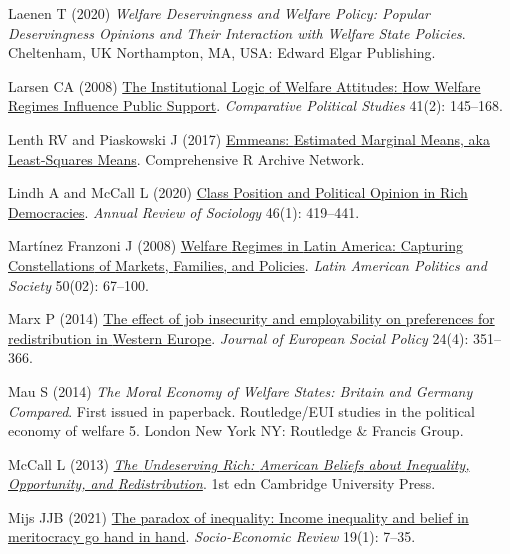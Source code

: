 \documentclass[
  12pt,
]{article}
\newlength{\cslhangindent}
\newenvironment{CSLReferences}[2] %
 {\begin{list}{}{%
  \setlength{\itemindent}{0pt}
  \setlength{\leftmargin}{0pt}
  \setlength{\parsep}{0pt}
  \ifodd #1
   \setlength{\leftmargin}{\cslhangindent}
   \setlength{\itemindent}{-1\cslhangindent}
  \fi
  \setlength{\itemsep}{#2\baselineskip}}}
 {\end{list}}
\begin{document}
\begin{CSLReferences}{1}{1}
Laenen T (2020) \emph{Welfare Deservingness and Welfare Policy: Popular
Deservingness Opinions and Their Interaction with Welfare State
Policies}. Cheltenham, UK Northampton, MA, USA: Edward Elgar Publishing.

Larsen CA (2008) \href{https://doi.org/10.1177/0010414006295234}{The
{Institutional Logic} of {Welfare Attitudes}: {How Welfare Regimes
Influence Public Support}}. \emph{Comparative Political Studies} 41(2):
145--168.

Lenth RV and Piaskowski J (2017)
\href{https://doi.org/10.32614/CRAN.package.emmeans}{Emmeans: {Estimated
Marginal Means}, aka {Least-Squares Means}}. Comprehensive R Archive
Network.

Lindh A and McCall L (2020)
\href{https://doi.org/10.1146/annurev-soc-121919-054609}{Class
{Position} and {Political Opinion} in {Rich Democracies}}. \emph{Annual
Review of Sociology} 46(1): 419--441.

Martínez Franzoni J (2008)
\href{https://doi.org/10.1111/j.1548-2456.2008.00013.x}{Welfare
{Regimes} in {Latin America}: {Capturing Constellations} of {Markets},
{Families}, and {Policies}}. \emph{Latin American Politics and Society}
50(02): 67--100.

Marx P (2014) \href{https://doi.org/10.1177/0958928714538217}{The effect
of job insecurity and employability on preferences for redistribution in
{Western Europe}}. \emph{Journal of European Social Policy} 24(4):
351--366.

Mau S (2014) \emph{The Moral Economy of Welfare States: {Britain} and
{Germany} Compared}. First issued in paperback. Routledge/{EUI} studies
in the political economy of welfare 5. London New York NY: Routledge \&
Francis Group.

McCall L (2013)
\emph{\href{https://doi.org/10.1017/CBO9781139225687}{The {Undeserving
Rich}: {American Beliefs} about {Inequality}, {Opportunity}, and
{Redistribution}}}. 1st edn Cambridge University Press.

Mijs JJB (2021) \href{https://doi.org/10.1093/ser/mwy051}{The paradox of
inequality: Income inequality and belief in meritocracy go hand in
hand}. \emph{Socio-Economic Review} 19(1): 7--35.


\end{CSLReferences}
\end{document}
